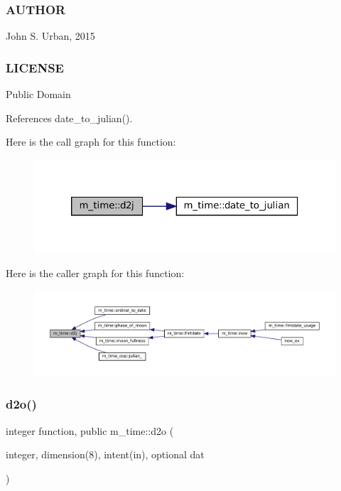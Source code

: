 \subsubsection*{A\+U\+T\+H\+OR}

John S. Urban, 2015 \subsubsection*{L\+I\+C\+E\+N\+SE}

Public Domain 

References date\+\_\+to\+\_\+julian().

Here is the call graph for this function\+:\nopagebreak
\begin{figure}[H]
\begin{center}
\leavevmode
\includegraphics[width=320pt]{namespacem__time_a3fccc53c2650104eff084c7998d18f54_cgraph}
\end{center}
\end{figure}
Here is the caller graph for this function\+:\nopagebreak
\begin{figure}[H]
\begin{center}
\leavevmode
\includegraphics[width=350pt]{namespacem__time_a3fccc53c2650104eff084c7998d18f54_icgraph}
\end{center}
\end{figure}
\mbox{\label{namespacem__time_a727dd77bbd4a5d0e3947c5d303845947}} 
\subsubsection{\texorpdfstring{d2o()}{d2o()}}
{\footnotesize\ttfamily integer function, public m\+\_\+time\+::d2o (\begin{DoxyParamCaption}\item[{integer, dimension(8), intent(in), optional}]{dat }\end{DoxyParamCaption})}



